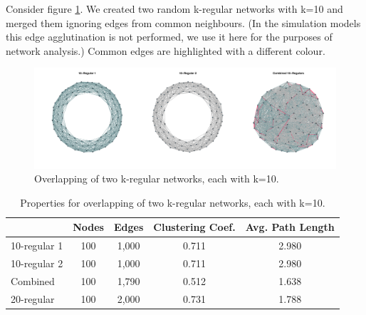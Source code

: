 \documentclass[preprint,number]{elsarticle}
\begin{document}
        \noindent Consider figure \ref{fig:network_properties_merge_2_10regular}. We created two
        random k-regular networks with k=10 and merged them ignoring edges from common neighbours.
        (In the simulation models this edge agglutination is not performed, we use it here for the
        purposes of network analysis.) Common edges are highlighted with a different colour.

        \begin{figure}
          \centering
          \includegraphics[width=1\linewidth]{"../analysis/pdf/network_properties_merge_2_10regular"}
          \begin{minipage}{0.9\textwidth}
            \caption{Overlapping of two k-regular networks, each with k=10.}
            \label{fig:network_properties_merge_2_10regular}
          \end{minipage}
        \end{figure}

        \begin{table}
          \centering
          \begin{minipage}{0.9\textwidth}
            \caption{Properties for overlapping of two k-regular networks, each with k=10.}
            \label{tab:network_properties_merge_2_10regular}
          \end{minipage}
          \begin{tabular}{lcccc}
            & Nodes &  Edges & Clustering Coef.	  &  Avg. Path Length \\ 
            \hline  10-regular 1 & 100 &  1,000  &  0.711 &  2.980 \\ 
            \hline  10-regular 2 & 100 & 1,000 & 0.711 &  2.980 \\ 
            \hline  Combined & 100 & 1,790  & 0.512 &  1.638 \\ 
            \hline 20-regular & 100 & 2,000	& 0.731	& 1.788 \\
            \hline 
          \end{tabular} 
        \end{table}
\end{document}
